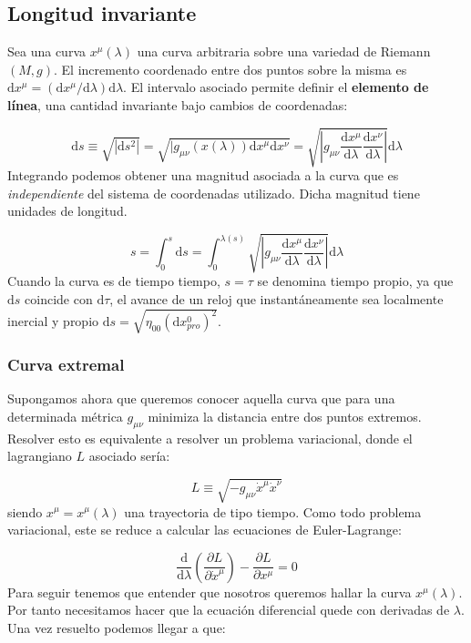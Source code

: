 \documentclass[12pt,a4paper]{book}
\numberwithin{equation}{section}
\numberwithin{figure}{section}
\newcommand{\parentesis}[1]{\left( #1  \right)}
\newcommand{\parciales}[2]{\frac{\partial #1}{\partial #2}}
\newcommand{\D}{\mathrm{d}}
\newcommand{\derivadas}[2]{\frac{\D #1}{\D #2}}
\begin{document}
\subsection{Longitud invariante}

Sea una curva $x^\mu (\lambda)$ una curva arbitraria sobre una variedad de Riemann $(M,g)$. El incremento coordenado entre dos puntos sobre la misma es $\D x^\mu = (\D x^\mu / \D \lambda) \D \lambda$. El intervalo asociado permite definir el \textbf{elemento de línea}, una cantidad invariante bajo cambios de coordenadas:


\begin{equation}
\D s \equiv \sqrt{|\D s^2 |} = \sqrt{|g_{\mu \nu} (x(\lambda)) \D x^\mu \D x^\nu} = \sqrt{\left| g_{\mu \nu} \derivadas{x^\mu}{\lambda} \derivadas{x^\nu}{\lambda} \right|} \D \lambda
\end{equation}
Integrando podemos obtener una magnitud asociada a la curva que es \textit{independiente} del sistema de coordenadas utilizado. Dicha magnitud tiene unidades de longitud.

\begin{equation}
s = \int_0^s \D s = \int_0^{\lambda(s)} \sqrt{\left| g_{\mu \nu} \derivadas{x^\mu}{\lambda} \derivadas{x^\nu}{\lambda} \right|} \D \lambda
\end{equation}
Cuando la curva es de tiempo tiempo, $s=\tau$ se denomina tiempo propio, ya que $\D s $ coincide con $\D \tau$, el avance de un reloj que instantáneamente sea localmente inercial y propio $\D s = \sqrt{\eta_{00} (\D x^0_{pro})^2}$. \\

\subsubsection{Curva extremal}

Supongamos ahora que queremos conocer aquella curva que para una determinada métrica $g_{\mu \nu}$ minimiza la distancia entre dos puntos extremos. Resolver esto es equivalente a resolver un problema variacional, donde el lagrangiano $L$ asociado sería:

\begin{equation}
L \equiv \sqrt{-g_{\mu \nu} \dot{x}^\mu \dot{x}^\nu}
\end{equation}
siendo $x^\mu = x^\mu (\lambda)$ una trayectoria de tipo tiempo. Como todo problema variacional, este se reduce a calcular las ecuaciones de Euler-Lagrange: 

\begin{equation}
\dfrac{\D }{\D \lambda} \parentesis{\parciales{L}{\dot{x}^\mu}} - \parciales{L}{x^\mu} = 0
\end{equation}
Para seguir tenemos que entender que nosotros queremos hallar la curva $x^\mu(\lambda)$. Por tanto necesitamos hacer que la ecuación diferencial quede con derivadas de $\lambda$. Una vez resuelto podemos llegar a que:
\end{document}
